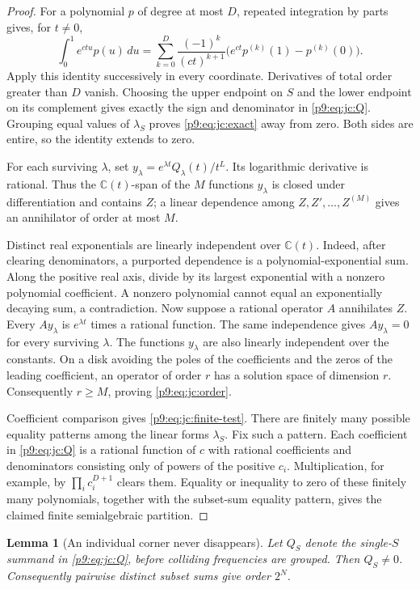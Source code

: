 \documentclass[11pt,a4paper]{article}
\newtheorem{lemma}[theorem]{Lemma}
\theoremstyle{definition}
\theoremstyle{remark}
\numberwithin{equation}{section}
\begin{document}
\begin{proof}
For a polynomial $p$ of degree at most $D$, repeated integration by
parts gives, for $t\ne0$,
\[
 \int_0^1 e^{ctu}p(u)\,du
 =\sum_{k=0}^{D}\frac{(-1)^k}{(ct)^{k+1}}
       \bigl(e^{ct}p^{(k)}(1)-p^{(k)}(0)\bigr).
\]
Apply this identity successively in every coordinate.  Derivatives of
total order greater than $D$ vanish.  Choosing the upper endpoint on
$S$ and the lower endpoint on its complement gives exactly the sign
and denominator in \eqref{p9:eq:jc:Q}.  Grouping equal values of
$\lambda_S$ proves \eqref{p9:eq:jc:exact} away from zero.  Both sides
are entire, so the identity extends to zero.

For each surviving $\lambda$, set
$y_\lambda=e^{\lambda t}Q_\lambda(t)/t^L$.  Its logarithmic derivative
is rational.  Thus the $\mathbb C(t)$-span of the $M$ functions
$y_\lambda$ is closed under differentiation and contains $Z$; a
linear dependence among $Z,Z',\ldots,Z^{(M)}$ gives an annihilator of
order at most $M$.

Distinct real exponentials are linearly independent over
$\mathbb C(t)$.  Indeed, after clearing denominators, a purported
dependence is a polynomial-exponential sum.  Along the positive real
axis, divide by its largest exponential with a nonzero polynomial
coefficient.  A nonzero polynomial cannot equal an exponentially
decaying sum, a contradiction.  Now suppose a rational operator $A$
annihilates $Z$.  Every $Ay_\lambda$ is $e^{\lambda t}$ times a
rational function.  The same independence gives $Ay_\lambda=0$ for
every surviving $\lambda$.  The functions $y_\lambda$ are also
linearly independent over the constants.  On a disk avoiding the
poles of the coefficients and the zeros of the leading coefficient,
an operator of order $r$ has a solution space of dimension $r$.
Consequently $r\ge M$, proving \eqref{p9:eq:jc:order}.

Coefficient comparison gives \eqref{p9:eq:jc:finite-test}.  There are
finitely many possible equality patterns among the linear forms
$\lambda_S$.  Fix such a pattern.  Each coefficient in
\eqref{p9:eq:jc:Q} is a rational function of $c$ with rational
coefficients and denominators consisting only of powers of the
positive $c_i$.  Multiplication, for example, by
$\prod_i c_i^{D+1}$ clears them.  Equality or inequality to zero
of these finitely many polynomials, together with the subset-sum
equality pattern, gives the claimed finite semialgebraic partition.
\end{proof}

\begin{lemma}[An individual corner never disappears]
\label{p9:lem:jc:single-corner}
Let $Q_S$ denote the single-$S$ summand in \eqref{p9:eq:jc:Q}, before
colliding frequencies are grouped.  Then $Q_S\ne0$.
Consequently pairwise distinct subset sums give order $2^N$.
\end{lemma}
\end{document}
